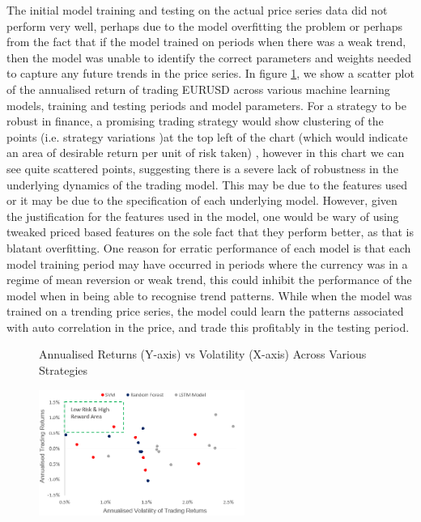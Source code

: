 \documentclass[11pt]{article}
\begin{document}
The initial model training and testing on the actual price series data did not perform very well, perhaps due to the model overfitting the problem or perhaps from the fact that if the model trained on periods when there was a weak trend, then the model was unable to identify the correct parameters and weights needed to capture any future trends in the price series. In figure \ref{fig:ErraticRetScatter}, we show a scatter plot of the annualised return of trading EURUSD across various machine learning models, training and testing periods and model parameters. For a strategy to be robust in finance, a promising trading strategy would show clustering of the points (i.e. strategy variations )at the top left of the chart (which would indicate an area of desirable return per unit of risk taken) , however in this chart we can see quite scattered points, suggesting there is a severe lack of robustness in the underlying dynamics of the trading model. \newline This may be due to the features used or it may be due to the specification of each underlying model. However, given the justification for the features used in the model, one would be wary of using tweaked priced based features on the sole fact that they perform better, as that is blatant overfitting. One reason for erratic performance of each model is that each model training period may have occurred in periods where the currency was in a regime of mean reversion or weak trend, this could inhibit the performance of the model when in being able to recognise trend patterns. While when the model was trained on a trending price series, the model could learn the patterns associated with auto correlation in the price, and trade this profitably in the testing period. 

\begin{figure}[h]
    \centering
	\caption{Annualised Returns (Y-axis) vs Volatility (X-axis) Across Various Strategies}    
	\includegraphics[width=0.6\textwidth]{ErraticRetScatter}
    \label{fig:ErraticRetScatter}
     \caption*{}
\end{figure}
\end{document}
